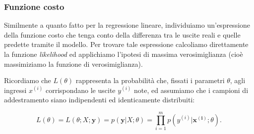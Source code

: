 \subsubsection{Funzione costo}\label{sec:funzione_costo_logistica}
Similmente a quanto fatto per la regressione lineare, individuiamo un'espressione della funzione costo che tenga conto della differenza tra le uscite reali e quelle predette tramite il modello. 
Per trovare tale espressione calcoliamo direttamente la funzione \emph{likelihood} ed applichiamo l'ipotesi di massima verosimiglianza (cioè massimiziamo la funzione di verosimiglianza).

Ricordiamo che $L(\theta)$ rappresenta la probabilità che, fissati i parametri $\theta$, agli ingressi $x^{(i)}$ corrispondano le uscite $y^{(i)}$ note, ed assumiamo che i campioni di addestramento siano indipendenti ed identicamente distribuiti:


\begin{equation}\label{eql_logistica}
   L(\theta) = L(\theta;X;\mathbf{y})=
    p(\mathbf{y}|X;\theta) 
    = \prod_{i=1}^m p(y^{(i)}|\mathbf{x^{(i)}};\theta).
 \end{equation}

